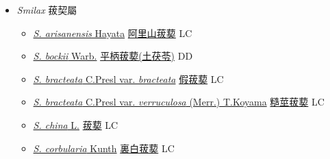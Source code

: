 
  \begin{itemize}
 \item[] \textit{Smilax} 菝契屬
                    
  \begin{itemize}
        \item[] \href{http://www.theplantlist.org/tpl1.1/search?q=Smilax+arisanensis}{\textit{S. arisanensis} Hayata}   \href{\detokenize{http://taibnet.sinica.edu.tw/chi/taibnet_species_list.php?T2=阿里山菝葜&T2_new_value=true&fr=y}}{阿里山菝葜} LC
        \item[] \href{http://www.theplantlist.org/tpl1.1/search?q=Smilax+bockii}{\textit{S. bockii} Warb.}        \href{\detokenize{http://taibnet.sinica.edu.tw/chi/taibnet_species_list.php?T2=平柄菝葜&T2_new_value=true&fr=y}}{平柄菝葜(土茯苓)}   DD
        \item[] \href{http://www.theplantlist.org/tpl1.1/search?q=Smilax+bracteata+var.+bracteata}{\textit{S. bracteata} C.Presl var. \textit{bracteata}}   \href{\detokenize{http://taibnet.sinica.edu.tw/chi/taibnet_species_list.php?T2=假菝葜&T2_new_value=true&fr=y}}{假菝葜} LC
        \item[] \href{http://www.theplantlist.org/tpl1.1/search?q=Smilax+bracteata+var.+verruculosa}{\textit{S. bracteata} C.Presl var. \textit{verruculosa} (Merr.) T.Koyama}   \href{\detokenize{http://taibnet.sinica.edu.tw/chi/taibnet_species_list.php?T2=糙莖菝葜&T2_new_value=true&fr=y}}{糙莖菝葜} LC
        \item[] \href{http://www.theplantlist.org/tpl1.1/search?q=Smilax+china}{\textit{S. china} L.}   \href{\detokenize{http://taibnet.sinica.edu.tw/chi/taibnet_species_list.php?T2=菝葜&T2_new_value=true&fr=y}}{菝葜} LC
        \item[] \href{http://www.theplantlist.org/tpl1.1/search?q=Smilax+corbularia}{\textit{S. corbularia} Kunth}   \href{\detokenize{http://taibnet.sinica.edu.tw/chi/taibnet_species_list.php?T2=裏白菝葜&T2_new_value=true&fr=y}}{裏白菝葜} LC

\end{itemize}
\end{itemize}
